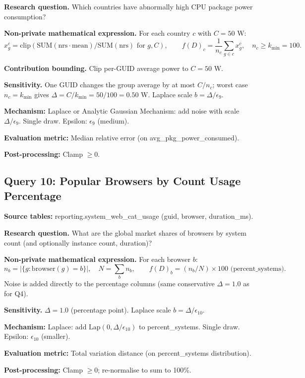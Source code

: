 \documentclass[12pt,letterpaper]{article}
\begin{document}
\textbf{Research question.} Which countries have abnormally high CPU package power consumption?

\textbf{Non-private mathematical expression.} For each country $c$ with $C = 50$ W:
\[
x_g^c = \text{clip}(\text{SUM}(\text{nrs} \cdot \text{mean})/\text{SUM}(\text{nrs}) \text{ for } g, C), \qquad
f(D)_c = \frac{1}{n_c} \sum_{g \in c} x_g^c, \quad n_c \geq k_{\min} = 100.
\]

\textbf{Contribution bounding.} Clip per-GUID average power to $C = 50$ W.

\textbf{Sensitivity.} One GUID changes the group average by at most $C/n_c$; worst case $n_c = k_{\min}$ gives $\Delta = C/k_{\min} = 50/100 = 0.50$ W. Laplace scale $b = \Delta/\epsilon_9$.

\textbf{Mechanism:} Laplace or Analytic Gaussian Mechanism: add noise with scale $\Delta/\epsilon_9$. Single draw. Epsilon: $\epsilon_9$ (medium).

\textbf{Evaluation metric:} Median relative error (on avg\_pkg\_power\_consumed).

\textbf{Post-processing:} Clamp $\geq 0$.

\subsection{Query 10: Popular Browsers by Count Usage Percentage}
\label{sec:q10}

\textbf{Source tables:} reporting.system\_web\_cat\_usage (guid, browser, duration\_ms).

\textbf{Research question.} What are the global market shares of browsers by system count (and optionally instance count, duration)?

\textbf{Non-private mathematical expression.} For each browser $b$:
\[
n_b = |\{g : \text{browser}(g) = b\}|, \quad N = \sum_b n_b, \qquad f(D)_b = (n_b / N) \times 100 \text{ (percent\_systems)}.
\]
Noise is added directly to the percentage columns (same conservative $\Delta = 1.0$ as for Q4).

\textbf{Sensitivity.} $\Delta = 1.0$ (percentage point). Laplace scale $b = \Delta/\epsilon_{10}$.

\textbf{Mechanism:} Laplace: add $\text{Lap}(0, \Delta/\epsilon_{10})$ to percent\_systems. Single draw. Epsilon: $\epsilon_{10}$ (smaller).

\textbf{Evaluation metric:} Total variation distance (on percent\_systems distribution).

\textbf{Post-processing:} Clamp $\geq 0$; re-normalise to sum to 100\%.
\end{document}
